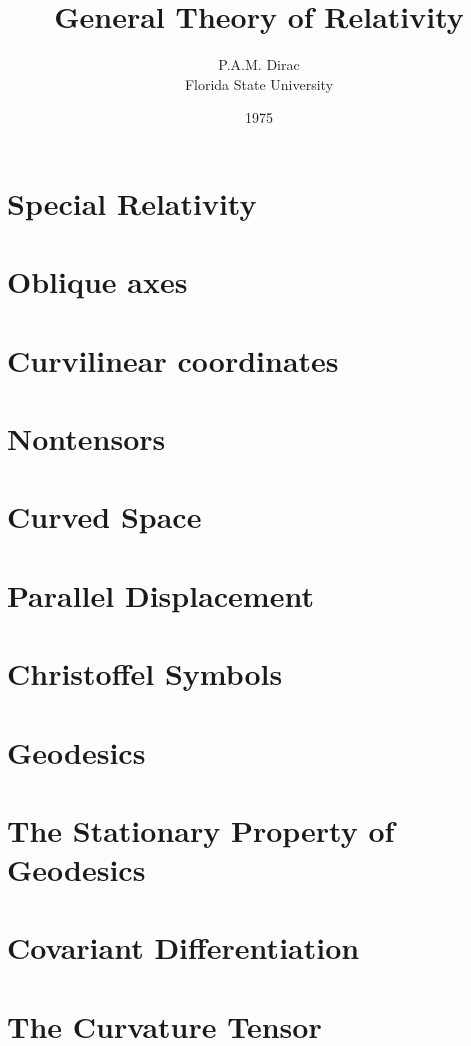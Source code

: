 \documentclass[10pt]{article}
\title{General Theory of Relativity}
\author{P.A.M. Dirac\\Florida State University}
\date{1975}
\begin{document}
\maketitle
\section{Special Relativity}

\section{Oblique axes}

\section{Curvilinear coordinates}

\section{Nontensors}

\section{Curved Space}

\section{Parallel Displacement}

\section{Christoffel Symbols}

\section{Geodesics}

\section{The Stationary Property of Geodesics}

\section{Covariant Differentiation}

\section{The Curvature Tensor}

\end{document}
